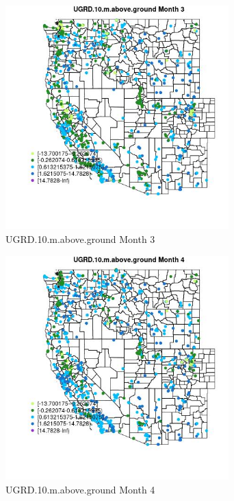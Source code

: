 \begin{figure} 
\centering  
\includegraphics[width=0.77\textwidth]{Code_Outputs/Report_ML_input_PM25_Step4_part_f_de_duplicated_aves_prioritize_24hr_obswNAs_MapObsMo3UGRD10maboveground.jpg} 
\caption{\label{fig:Report_ML_input_PM25_Step4_part_f_de_duplicated_aves_prioritize_24hr_obswNAsMapObsMo3UGRD10maboveground}UGRD.10.m.above.ground Month 3} 
\end{figure} 
 

\begin{figure} 
\centering  
\includegraphics[width=0.77\textwidth]{Code_Outputs/Report_ML_input_PM25_Step4_part_f_de_duplicated_aves_prioritize_24hr_obswNAs_MapObsMo4UGRD10maboveground.jpg} 
\caption{\label{fig:Report_ML_input_PM25_Step4_part_f_de_duplicated_aves_prioritize_24hr_obswNAsMapObsMo4UGRD10maboveground}UGRD.10.m.above.ground Month 4} 
\end{figure} 
 

